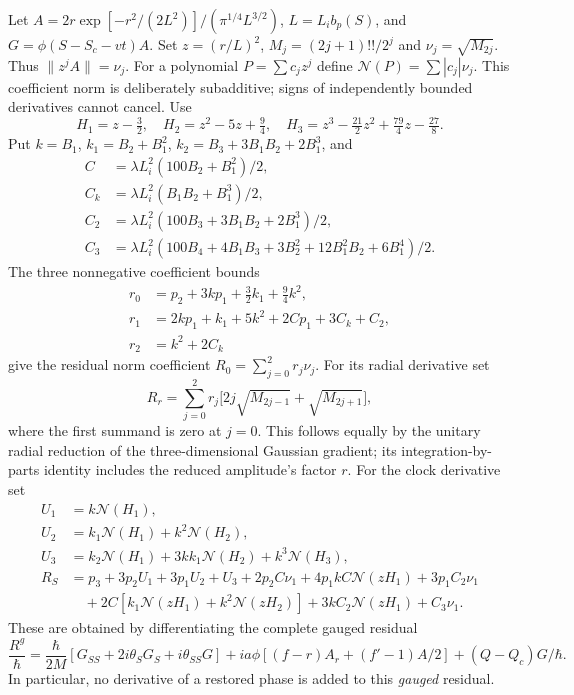 \documentclass[11pt]{article}
\theoremstyle{definition}\newtheorem{definition}[theorem]{Definition}
\theoremstyle{remark}\newtheorem{remark}[theorem]{Remark}
\begin{document}
Let $A=2r\exp[-r^2/(2L^2)]/(\pi^{1/4}L^{3/2})$,
$L=L_ib_p(S)$, and $G=\phi(S-S_c-vt)A$. Set $z=(r/L)^2$,
$M_j=(2j+1)!!/2^j$ and $\nu_j=\sqrt{M_{2j}}$.
Thus $\|z^jA\|=\nu_j$. For a polynomial $P=\sum c_jz^j$ define
$\mathcal N(P)=\sum|c_j|\nu_j$. This coefficient norm is deliberately
subadditive; signs of independently bounded derivatives cannot cancel.
Use
\[
 H_1=z-\tfrac32,\quad H_2=z^2-5z+\tfrac94,\quad
 H_3=z^3-\tfrac{21}2z^2+\tfrac{79}4z-\tfrac{27}8.
\]
Put $k=B_1$, $k_1=B_2+B_1^2$, $k_2=B_3+3B_1B_2+2B_1^3$, and
\begin{align*}
 C&=\lambda L_i^2(100B_2+B_1^2)/2,\\
 C_k&=\lambda L_i^2(B_1B_2+B_1^3)/2,\\
 C_2&=\lambda L_i^2(100B_3+3B_1B_2+2B_1^3)/2,\\
 C_3&=\lambda L_i^2(100B_4+4B_1B_3+3B_2^2
                         +12B_1^2B_2+6B_1^4)/2.
\end{align*}
The three nonnegative coefficient bounds
\begin{align*}
 r_0&=p_2+3kp_1+\tfrac32 k_1+\tfrac94k^2,\\
 r_1&=2kp_1+k_1+5k^2+2Cp_1+3C_k+C_2,\\
 r_2&=k^2+2C_k
\end{align*}
give the residual norm coefficient $R_0=\sum_{j=0}^2r_j\nu_j$.
For its radial derivative set
\[
 R_r=\sum_{j=0}^2r_j\bigl[2j\sqrt{M_{2j-1}}+\sqrt{M_{2j+1}}\bigr],
\]
where the first summand is zero at $j=0$. This follows equally by the
unitary radial reduction of the three-dimensional Gaussian gradient;
its integration-by-parts identity includes the reduced amplitude's
factor $r$. For the clock derivative set
\begin{align*}
 U_1&=k\mathcal N(H_1),\\
 U_2&=k_1\mathcal N(H_1)+k^2\mathcal N(H_2),\\
 U_3&=k_2\mathcal N(H_1)+3kk_1\mathcal N(H_2)+k^3\mathcal N(H_3),\\
 R_S&=p_3+3p_2U_1+3p_1U_2+U_3
       +2p_2C\nu_1+4p_1kC\mathcal N(zH_1)+3p_1C_2\nu_1\\
 &\quad+2C[k_1\mathcal N(zH_1)+k^2\mathcal N(zH_2)]
            +3kC_2\mathcal N(zH_1)+C_3\nu_1.
\end{align*}
These are obtained by differentiating the complete gauged residual
\begin{equation}
 \frac{R^g}{\hbar}=\frac{\hbar}{2M}
 [G_{SS}+2i\theta_SG_S+i\theta_{SS}G]
 +ia\phi[(f-r)A_r+(f'-1)A/2]+(Q-Q_c)G/\hbar.
 \label{prep:residual}
\end{equation}
In particular, no derivative of a restored phase is added to this
\emph{gauged} residual.
\end{document}
